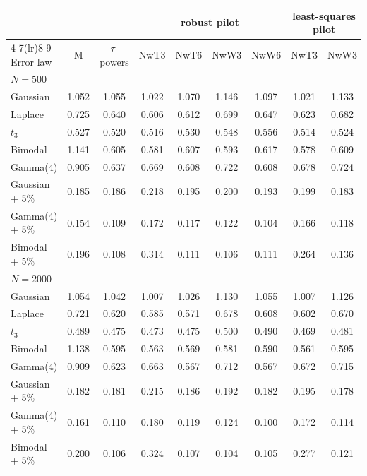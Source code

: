 \begin{tabular}{lcccccccc}
\toprule
 & & & \multicolumn{4}{c}{robust pilot} & \multicolumn{2}{c}{least-squares pilot} \\
\cmidrule(lr){4-7}\cmidrule(lr){8-9}
Error law & M & $\tau$-powers & NwT3 & NwT6 & NwW3 & NwW6 & NwT3 & NwW3 \\
\midrule
\multicolumn{9}{l}{\emph{$N=500$}} \\
Gaussian & 1.052 & 1.055 & 1.022 & 1.070 & 1.146 & 1.097 & 1.021 & 1.133 \\
Laplace & 0.725 & 0.640 & 0.606 & 0.612 & 0.699 & 0.647 & 0.623 & 0.682 \\
$t_3$ & 0.527 & 0.520 & 0.516 & 0.530 & 0.548 & 0.556 & 0.514 & 0.524 \\
Bimodal & 1.141 & 0.605 & 0.581 & 0.607 & 0.593 & 0.617 & 0.578 & 0.609 \\
Gamma(4) & 0.905 & 0.637 & 0.669 & 0.608 & 0.722 & 0.608 & 0.678 & 0.724 \\
Gaussian + 5\% & 0.185 & 0.186 & 0.218 & 0.195 & 0.200 & 0.193 & 0.199 & 0.183 \\
Gamma(4) + 5\% & 0.154 & 0.109 & 0.172 & 0.117 & 0.122 & 0.104 & 0.166 & 0.118 \\
Bimodal + 5\% & 0.196 & 0.108 & 0.314 & 0.111 & 0.106 & 0.111 & 0.264 & 0.136 \\
\multicolumn{9}{l}{\emph{$N=2000$}} \\
Gaussian & 1.054 & 1.042 & 1.007 & 1.026 & 1.130 & 1.055 & 1.007 & 1.126 \\
Laplace & 0.721 & 0.620 & 0.585 & 0.571 & 0.678 & 0.608 & 0.602 & 0.670 \\
$t_3$ & 0.489 & 0.475 & 0.473 & 0.475 & 0.500 & 0.490 & 0.469 & 0.481 \\
Bimodal & 1.138 & 0.595 & 0.563 & 0.569 & 0.581 & 0.590 & 0.561 & 0.595 \\
Gamma(4) & 0.909 & 0.623 & 0.663 & 0.567 & 0.712 & 0.567 & 0.672 & 0.715 \\
Gaussian + 5\% & 0.182 & 0.181 & 0.215 & 0.186 & 0.192 & 0.182 & 0.195 & 0.178 \\
Gamma(4) + 5\% & 0.161 & 0.110 & 0.180 & 0.119 & 0.124 & 0.100 & 0.172 & 0.114 \\
Bimodal + 5\% & 0.200 & 0.106 & 0.324 & 0.107 & 0.104 & 0.105 & 0.277 & 0.121 \\
\bottomrule
\end{tabular}
